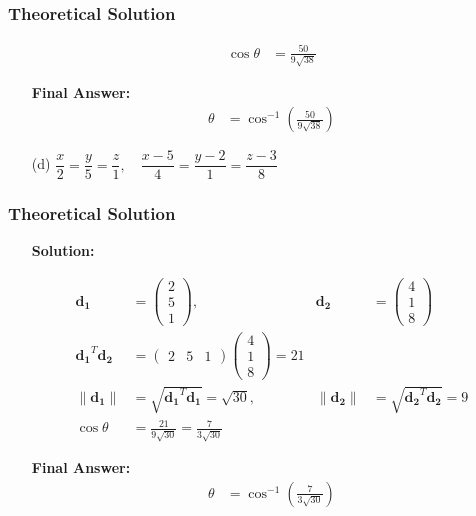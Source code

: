 \documentclass{beamer}
\theoremstyle{remark}
\newcommand{\myvec}[1]{\ensuremath{\begin{pmatrix}#1\end{pmatrix}}}
\let\vec\mathbf
\numberwithin{equation}{section}
\begin{document}
\begin{frame}
\frametitle{Theoretical Solution}
\begin{enumerate}
\item[]
\begin{align}
\cos\theta &= \frac{50}{9\sqrt{38}}
\end{align}

\textbf{Final Answer:}  
\begin{align}
\theta &= \cos^{-1}\!\left(\tfrac{50}{9\sqrt{38}}\right)
\end{align}

\item[(d)] 
$\dfrac{x}{2} = \dfrac{y}{5} = \dfrac{z}{1}, 
\quad 
\dfrac{x-5}{4} = \dfrac{y-2}{1} = \dfrac{z-3}{8}$

\end{enumerate}
    
\end{frame}

\begin{frame}
\frametitle{Theoretical Solution}

\begin{enumerate}
\item[]
\textbf{Solution:}  

\begin{align}
\vec{d_1} &= \myvec{2 \\ 5 \\ 1}, &
\vec{d_2} &= \myvec{4 \\ 1 \\ 8} \\[6pt]
\vec{d_1}^T \vec{d_2} &= \myvec{2 & 5 & 1}\myvec{4 \\ 1 \\ 8} = 21 \\[6pt]
\|\vec{d_1}\| &= \sqrt{\vec{d_1}^T \vec{d_1}} = \sqrt{30}, &
\|\vec{d_2}\| &= \sqrt{\vec{d_2}^T \vec{d_2}} = 9 \\[6pt]
\cos\theta &= \frac{21}{9\sqrt{30}} = \frac{7}{3\sqrt{30}}
\end{align}

\textbf{Final Answer:}  
\begin{align}
\theta &= \cos^{-1}\!\left(\tfrac{7}{3\sqrt{30}}\right)
\end{align}

\end{enumerate}
    
\end{frame}
\end{document}
